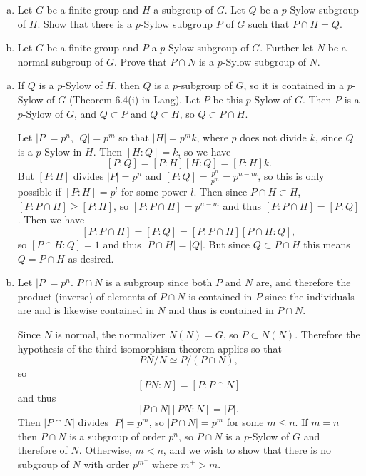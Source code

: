 \documentclass{article}
\newcounter{Problem}
\newenvironment{Problem}{\begin{Exercise}[name={Problem},
                                          counter={Problem}]}
                        {\end{Exercise}}
\begin{document}
\pagebreak
\begin{Problem}
\begin{enumerate}[(a)]
\item{Let $G$ be a finite group and $H$ a subgroup of $G$. Let $Q$ be
    a $p$-Sylow subgroup of $H$. Show that there is a $p$-Sylow
    subgroup $P$ of $G$ such that $P \cap H = Q$.}
\item{Let $G$ be a finite group and $P$ a $p$-Sylow subgroup of
    $G$. Further let $N$ be a normal subgroup of $G$. Prove that $P
    \cap N$ is a $p$-Sylow subgroup of $N$.}
\end{enumerate}
\end{Problem}

\begin{Answer}
\begin{enumerate}[(a)]
  \item{
    If $Q$ is a $p$-Sylow of $H$, then $Q$ is a $p$-subgroup of $G$,
    so it is contained in a $p$-Sylow of $G$ (Theorem 6.4(i) in Lang).
    Let $P$ be this $p$-Sylow of $G$. Then $P$ is a $p$-Sylow of $G$,
    and $Q \subset P$ and $Q \subset H$, so $Q \subset P \cap H$.

    Let $|P| = p^n$, $|Q| = p^m$ so that $|H| = p^m k$,
    where $p$ does not divide $k$,
    since $Q$ is a $p$-Sylow in $H$. Then $[H : Q] = k$, so we have
    $$
    [P : Q] = [P : H][H : Q] = [P : H]k.
    $$
    But $[P : H]$ divides $|P| = p^n$ and
    $[P : Q] = \frac{p^n}{p^m} = p^{n - m}$, so this is only possible
    if $[P : H] = p^l$ for some power $l$. Then since
    $P \cap H \subset H$,
    $[P : P \cap H] \geq [P : H]$, so $[P : P \cap H] = p^{n - m}$
    and thus $[P : P \cap H] = [P : Q]$. Then we have
    $$
    [P : P \cap H] = [P : Q] = [P : P \cap H] [P \cap H : Q],
    $$
    so $[P \cap H : Q] = 1$ and thus $|P \cap H| = |Q|$. But since
    $Q \subset P \cap H$ this means $Q = P \cap H$ as desired.
  }
  \item{
    Let $|P| = p^n$. $P \cap N$ is a subgroup since both $P$ and $N$
    are, and therefore the product (inverse) of elements of $P \cap N$ is
    contained in $P$ since the individuals are and is likewise
    contained in $N$ and thus is contained in $P \cap N$.

    Since $N$ is normal, the normalizer $N(N) = G$, so $P \subset
    N(N)$. Therefore the hypothesis of the third isomorphism theorem
    applies so that
    $$
    PN / N \simeq P / (P \cap N),
    $$
    so
    $$
    [PN : N] = [P : P \cap N]
    $$
    and thus
    $$
    |P \cap N| [PN : N] = |P|.
    $$
    Then $|P \cap N|$ divides $|P| = p^m$, so $|P \cap N| = p^m$ for
    some $m \leq n$. If $m = n$ then $P \cap N$ is a subgroup of order
    $p^n$, so $P \cap N$ is a $p$-Sylow of $G$ and therefore of
    $N$. Otherwise, $m < n$, and we wish to show that there is no
    subgroup of $N$ with order $p^{m^+}$ where $m^+ > m$.

}
\end{enumerate}
\end{Answer}
\end{document}
